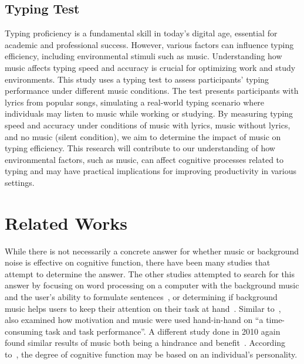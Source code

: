 \documentclass[manuscript, screen, review]{acmart} %
\begin{document}
\subsection{Typing Test}
Typing proficiency is a fundamental skill in today's digital age, essential for academic and professional success. However, various factors can influence typing efficiency, including environmental stimuli such as music. Understanding how music affects typing speed and accuracy is crucial for optimizing work and study environments.
This study uses a typing test to assess participants' typing performance under different music conditions. The test presents participants with lyrics from popular songs, simulating a real-world typing scenario where individuals may listen to music while working or studying.
By measuring typing speed and accuracy under conditions of music with lyrics, music without lyrics, and no music (silent condition), we aim to determine the impact of music on typing efficiency. This research will contribute to our understanding of how environmental factors, such as music, can affect cognitive processes related to typing and may have practical implications for improving productivity in various settings.


\section{Related Works}
While there is not necessarily a concrete answer for whether music or background noise is effective on cognitive function, there have been many
studies that attempt to determine the answer. The other studies attempted to search for this answer by
focusing on word processing on a computer with the background music and the user's ability to formulate sentences~\cite{ransdell2001141}, 
or determining if background music helps users to keep their attention on their task at hand~\cite{kiss2021effect}. Similar to~\cite{kiss2021effect},~\cite{mathew2022inherently} also examined how motivation and music were used hand-in-hand on ``a time-consuming task and task performance''. A different study done in 2010 again found similar results of music both being a hindrance and benefit~\cite{AudioDistractionsAshley}. According to~\cite{Gonzalez_Aiello_2019}, the degree of cognitive function may be based on an individual's personality.
\end{document}
